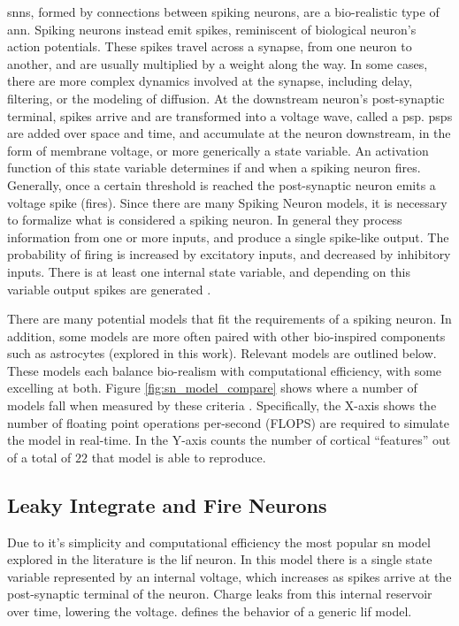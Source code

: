     \glspl{snn}, formed by connections between spiking neurons, are a
    bio-realistic type of \gls{ann}. Spiking neurons instead emit spikes,
    reminiscent of biological neuron's action potentials. These spikes travel
    across a synapse, from one neuron to another, and are usually multiplied by
    a weight along the way. In some cases, there are more complex dynamics
    involved at the synapse, including delay, filtering, or the modeling of
    diffusion. At the downstream neuron's post-synaptic terminal, spikes arrive
    and are transformed into a voltage wave, called a \gls{psp}. \glspl{psp} are
    added over space and time, and accumulate at the neuron downstream, in the
    form of membrane voltage, or more generically a state variable. An
    activation function of this state variable determines if and when a spiking
    neuron fires. Generally, once a certain threshold is reached the
    post-synaptic neuron emits a voltage spike (fires). Since there are many
    Spiking Neuron models, it is necessary to formalize what is considered a
    spiking neuron. In general they process information from one or more inputs,
    and produce a single spike-like output. The probability of firing is
    increased by excitatory inputs, and decreased by inhibitory inputs. There is
    at least one internal state variable, and depending on this variable output
    spikes are generated \parencite{ponulak_2011}.
    
    There are many potential models that fit the requirements of a spiking
    neuron. In addition, some models are more often paired with other
    bio-inspired components such as astrocytes (explored in this work). Relevant
    models are outlined below. These models each balance bio-realism with
    computational efficiency, with some excelling at both. Figure
    \ref{fig:sn_model_compare} shows where a number of models fall when measured
    by these criteria \parencite{izhikevich_2004}. Specifically, the X-axis
    shows the number of floating point operations per-second (FLOPS) are
    required to simulate the model in real-time. In the Y-axis counts the number
    of cortical ``features'' out of a total of $22$ that model is able to
    reproduce.
    

    \subsection{Leaky Integrate and Fire Neurons}
    Due to it's simplicity and computational efficiency the most popular
    \gls{sn} model explored in the literature is the \gls{lif} neuron. In this
    model there is a single state variable represented by an internal voltage,
    which increases as spikes arrive at the post-synaptic terminal of the
    neuron. Charge leaks from this internal reservoir over time, lowering the
    voltage.  defines the behavior of a generic \gls{lif} model.

